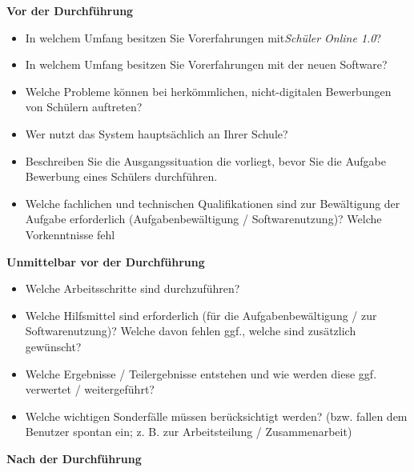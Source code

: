 \textbf{Vor der Durchführung}
\begin{itemize}
    \item In welchem Umfang besitzen Sie Vorerfahrungen mit\textit{Schüler Online 1.0}?
    \item In welchem Umfang besitzen Sie Vorerfahrungen mit der neuen Software?
    \item Welche Probleme können bei herkömmlichen, nicht-digitalen Bewerbungen von Schülern auftreten?
    \item Wer nutzt das System hauptsächlich an Ihrer Schule?
    \item Beschreiben Sie die Ausgangssituation die vorliegt, bevor Sie die Aufgabe \glqq Bewerbung eines Schülers\grqq{} durchführen.
    \item Welche fachlichen und technischen Qualifikationen sind zur Bewältigung der Aufgabe erforderlich (Aufgabenbewältigung / Softwarenutzung)? Welche Vorkenntnisse fehl
\end{itemize}
\textbf{Unmittelbar vor der Durchführung}
\begin{itemize}
    \item Welche Arbeitsschritte sind durchzuführen?
    \item Welche Hilfsmittel sind erforderlich (für die Aufgabenbewältigung / zur Softwarenutzung)? Welche davon fehlen ggf., welche sind zusätzlich gewünscht?
    \item Welche Ergebnisse / Teilergebnisse entstehen und wie werden diese ggf. verwertet / weitergeführt?
    \item Welche wichtigen Sonderfälle müssen berücksichtigt werden? (bzw. fallen dem Benutzer spontan ein; z. B. zur Arbeitsteilung / Zusammenarbeit)
\end{itemize}
\textbf{Nach der Durchführung}
